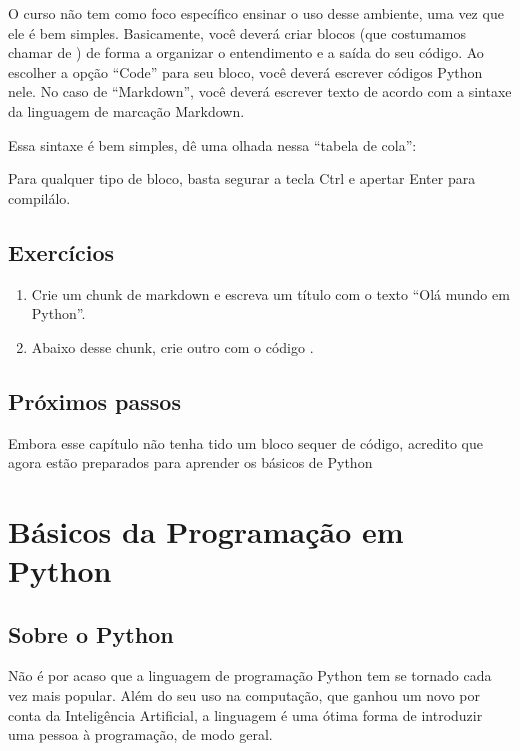 \documentclass[letterpaper,10pt,english]{jupyterBook}
\begin{document}
\sphinxAtStartPar
O curso não tem como foco específico ensinar o uso desse ambiente, uma vez que ele é bem simples. Basicamente, você deverá criar blocos (que costumamos chamar de ) de forma a organizar o entendimento e a saída do seu código. Ao escolher a opção “Code” para seu bloco, você deverá escrever códigos Python nele. No caso de “Markdown”, você deverá escrever texto de acordo com a sintaxe da linguagem de marcação Markdown.

\sphinxAtStartPar
Essa sintaxe é bem simples, dê uma olhada nessa “tabela de cola”: 

\sphinxAtStartPar
Para qualquer tipo de bloco, basta segurar a tecla Ctrl e apertar Enter para compilá\sphinxhyphen{}lo.


\section{Exercícios}
\label{\detokenize{chapters/1:exercicios}}\begin{enumerate}
%
\item {} 
\sphinxAtStartPar
Crie um chunk de markdown e escreva um título com o texto “Olá mundo em Python”.

\item {} 
\sphinxAtStartPar
Abaixo desse chunk, crie outro com o código .

\end{enumerate}


\section{Próximos passos}
\label{\detokenize{chapters/1:proximos-passos}}
\sphinxAtStartPar
Embora esse capítulo não tenha tido um bloco sequer de código, acredito que agora estão preparados para aprender os básicos de Python


\chapter{Básicos da Programação em Python}
\label{\detokenize{chapters/2:basicos-da-programacao-em-python}}\label{\detokenize{chapters/2::doc}}

\section{Sobre o Python}
\label{\detokenize{chapters/2:sobre-o-python}}
\sphinxAtStartPar
Não é por acaso que a linguagem de programação Python tem se tornado cada vez mais popular. Além do seu uso na computação, que ganhou um novo  por conta da Inteligência Artificial, a linguagem é uma ótima forma de introduzir uma pessoa à programação, de modo geral.
\end{document}
